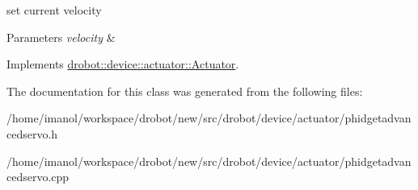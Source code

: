 set current velocity 


\begin{DoxyParams}{Parameters}
{\em velocity} & \\
\hline
\end{DoxyParams}


Implements \hyperlink{classdrobot_1_1device_1_1actuator_1_1Actuator_a452a63a9cf5daf479c12b99c3e99679c}{drobot\-::device\-::actuator\-::\-Actuator}.



The documentation for this class was generated from the following files\-:\begin{DoxyCompactItemize}
\item 
/home/imanol/workspace/drobot/new/src/drobot/device/actuator/phidgetadvancedservo.\-h\item 
/home/imanol/workspace/drobot/new/src/drobot/device/actuator/phidgetadvancedservo.\-cpp\end{DoxyCompactItemize}
